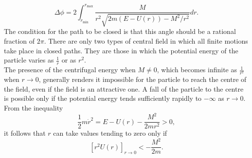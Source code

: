 \[\Delta \phi = 2 \int_{r_{\mathrm{min}}}^{r_{\mathrm{max}}} \frac{M}{r^2 \sqrt{2m(E-U(r))-M^2/r^2}} dr.\]
The condition for the path to be closed is that this angle should be a rational fraction of $2\pi$. There are only two types of central field in which all finite motions take place in closed paths. They are those in which the potential energy of the particle varies as $\frac{1}{r}$ or as $r^2$.
\\
The presence of the centrifugal energy when $M \neq 0$, which becomes infinite as $\frac{1}{r^2}$ when $r \to 0$, generally renders it impossible for the particle to reach the centre of the field, even if the field is an attractive one. 
A fall of the particle to the centre is possible only if the potential energy tends sufficiently rapidly to $-\infty$ as $r \to 0$. From the inequality
\[\frac{1}{2} m\dot{r}^2 = E - U(r) - \frac{M^2}{2mr^2} > 0,\]
it follows that $r$ can take values tending to zero only if
\[[r^2 U(r)]_{r\to 0} < -\frac{M^2}{2m}.\]

